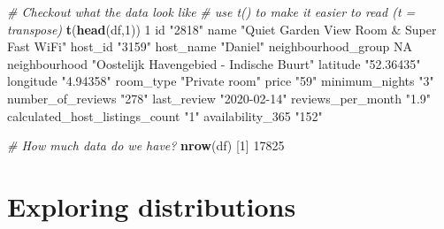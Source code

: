 \documentclass[
]{book}
\newenvironment{Shaded}{\begin{snugshade}}{\end{snugshade}}
\newcommand{\CommentTok}[1]{\textcolor[rgb]{0.56,0.35,0.01}{\textit{#1}}}
\newcommand{\DecValTok}[1]{\textcolor[rgb]{0.00,0.00,0.81}{#1}}
\newcommand{\KeywordTok}[1]{\textcolor[rgb]{0.13,0.29,0.53}{\textbf{#1}}}
\newcommand{\NormalTok}[1]{#1}
\newcommand{\OtherTok}[1]{\textcolor[rgb]{0.56,0.35,0.01}{#1}}
\newcommand{\StringTok}[1]{\textcolor[rgb]{0.31,0.60,0.02}{#1}}
\begin{document}
\begin{Shaded}
\begin{Highlighting}[]
\CommentTok{# Checkout what the data look like}
\CommentTok{# use t() to make it easier to read (t = transpose)}
\KeywordTok{t}\NormalTok{(}\KeywordTok{head}\NormalTok{(df,}\DecValTok{1}\NormalTok{))}
                               \DecValTok{1}                                         
\NormalTok{id                             }\StringTok{"2818"}                                    
\NormalTok{name                           }\StringTok{"Quiet Garden View Room & Super Fast WiFi"}
\NormalTok{host_id                        }\StringTok{"3159"}                                    
\NormalTok{host_name                      }\StringTok{"Daniel"}                                  
\NormalTok{neighbourhood_group            }\OtherTok{NA}                                        
\NormalTok{neighbourhood                  }\StringTok{"Oostelijk Havengebied - Indische Buurt"}  
\NormalTok{latitude                       }\StringTok{"52.36435"}                                
\NormalTok{longitude                      }\StringTok{"4.94358"}                                 
\NormalTok{room_type                      }\StringTok{"Private room"}                            
\NormalTok{price                          }\StringTok{"59"}                                      
\NormalTok{minimum_nights                 }\StringTok{"3"}                                       
\NormalTok{number_of_reviews              }\StringTok{"278"}                                     
\NormalTok{last_review                    }\StringTok{"2020-02-14"}                              
\NormalTok{reviews_per_month              }\StringTok{"1.9"}                                     
\NormalTok{calculated_host_listings_count }\StringTok{"1"}                                       
\NormalTok{availability_}\DecValTok{365}               \StringTok{"152"}                                     

\CommentTok{# How much data do we have?}
\KeywordTok{nrow}\NormalTok{(df)}
\NormalTok{[}\DecValTok{1}\NormalTok{] }\DecValTok{17825}
\end{Highlighting}
\end{Shaded}

\hypertarget{exploring-distributions}{%
\section*{Exploring distributions}\label{exploring-distributions}}
\end{document}
